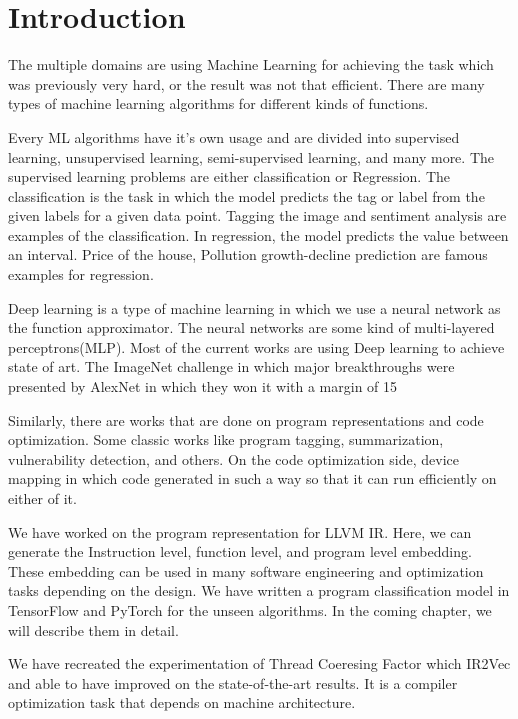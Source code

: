 \chapter{Introduction}
\label{chap:intro}

        The multiple domains are using Machine Learning for achieving the task which was previously very hard, or the result was not that efficient. There are many types of machine learning algorithms for different kinds of functions.

	    Every ML algorithms have it’s own usage and are divided into supervised learning, unsupervised learning, semi-supervised learning, and many more. The supervised learning problems are either classification or Regression. The classification is the task in which the model predicts the tag or label from the given labels for a given data point. Tagging the image and sentiment analysis are examples of the classification. In regression, the model predicts the value between an interval. Price of the house, Pollution growth-decline prediction are famous examples for regression.
	
	    Deep learning is a type of machine learning in which we use a neural network as the function approximator. The neural networks are some kind of multi-layered perceptrons(MLP). Most of the current works are using Deep learning to achieve state of art. The ImageNet challenge in which major breakthroughs were presented by AlexNet in which they won it with a margin of 15%
	
	    Similarly, there are works that are done on program representations and code optimization. Some classic works like program tagging, summarization, vulnerability detection, and others. On the code optimization side, device mapping in which code generated in such a way so that it can run efficiently on either of it.
	   
	    We have worked on the program representation for LLVM IR. Here, we can generate the Instruction level, function level, and program level embedding. These embedding can be used in many software engineering and optimization tasks depending on the design. We have written a program classification model in TensorFlow and PyTorch for the unseen algorithms. In the coming chapter, we will describe them in detail.	
    	
    	We have recreated the experimentation of Thread Coeresing Factor which IR2Vec and able to have improved on the state-of-the-art results. It is a compiler optimization task that depends on machine architecture. 